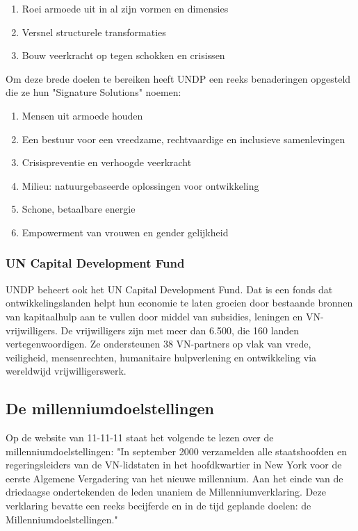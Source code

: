 \begin{enumerate}
\item Roei armoede uit in al zijn vormen en dimensies
\item Versnel structurele transformaties
\item Bouw veerkracht op tegen schokken en crisissen
\end{enumerate}

Om deze brede doelen te bereiken heeft UNDP een reeks benaderingen opgesteld die ze hun "Signature Solutions" noemen:

\begin{enumerate}
	\item Mensen uit armoede houden
	\item Een bestuur voor een vreedzame, rechtvaardige en inclusieve samenlevingen
	\item Crisispreventie en verhoogde veerkracht
	\item Milieu: natuurgebaseerde oplossingen voor ontwikkeling
	\item Schone, betaalbare energie
	\item Empowerment van vrouwen en gender gelijkheid
\end{enumerate}

\subsubsection{UN Capital Development Fund}
UNDP beheert ook het UN Capital Development Fund. Dat is een fonds dat ontwikkelingslanden helpt hun economie te laten groeien door bestaande bronnen van kapitaalhulp aan te vullen door middel van subsidies, leningen en VN-vrijwilligers. De vrijwilligers zijn met meer dan 6.500, die 160 landen vertegenwoordigen. Ze ondersteunen 38 VN-partners op vlak van vrede, veiligheid, mensenrechten, humanitaire hulpverlening en ontwikkeling via wereldwijd vrijwilligerswerk. \autocite{DevelopmentProgram2020}

\subsection{De millenniumdoelstellingen}
Op de website van 11-11-11 staat het volgende te lezen over de millenniumdoelstellingen: "In september 2000 verzamelden alle staatshoofden en regeringsleiders van de VN-lidstaten in het hoofdkwartier in New York voor de eerste Algemene Vergadering van het nieuwe millennium. Aan het einde van de driedaagse ondertekenden de leden unaniem de Millenniumverklaring. Deze verklaring bevatte een reeks becijferde en in de tijd geplande doelen: de Millenniumdoelstellingen." \autocite{11.11.112019}

